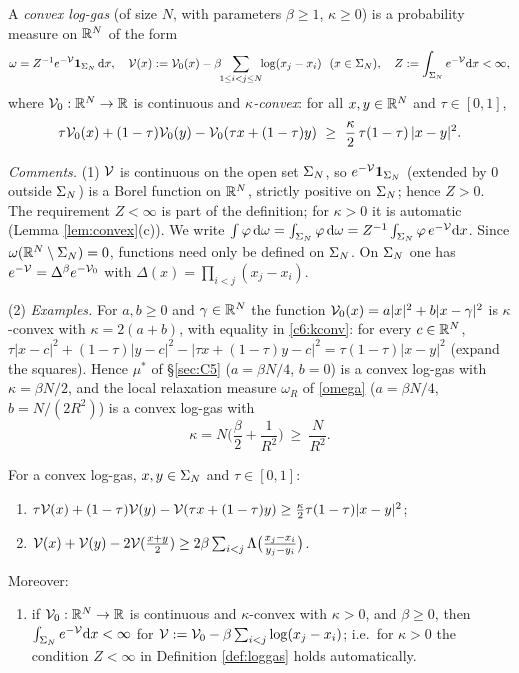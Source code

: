 \begin{definition}\label{def:loggas}
A \emph{convex log-gas} (of size $N$, with parameters $\beta\ge1$, $\kappa\ge0$) is a probability measure on $\mathbb{R}^N$ of the form
\[\omega=Z^{-1}e^{-\mathcal{V}}\mathbf 1_{\Sigma_N}\,\mathrm{d} x,\quad \mathcal{V}(x):=\mathcal{V}_0(x)-\beta\!\!\sum_{1\le i<j\le N}\!\!\log(x_j-x_i)\ \ (x\in\Sigma_N),\quad Z:=\int_{\Sigma_N}e^{-\mathcal{V}}\mathrm{d} x<\infty,\]
where $\mathcal{V}_0:\mathbb{R}^N\to\mathbb{R}$ is continuous and \emph{$\kappa$-convex}: for all $x,y\in\mathbb{R}^N$ and $\tau\in[0,1]$,
\begin{equation}\label{c6:kconv}
\tau\cV_0(x)+(1-\tau)\cV_0(y)-\cV_0(\tau x+(1-\tau)y)\ \ge\ \frac\kappa2\,\tau(1-\tau)\,|x-y|^2 .
\end{equation}
\end{definition}

\noindent\emph{Comments.}
(1) $\mathcal{V}$ is continuous on the open set $\Sigma_N$, so $e^{-\mathcal{V}}\mathbf 1_{\Sigma_N}$ (extended by $0$ outside $\Sigma_N$) is a Borel function on $\mathbb{R}^N$, strictly positive on $\Sigma_N$; hence $Z>0$. The requirement $Z<\infty$ is part of the definition; for $\kappa>0$ it is automatic (Lemma \ref{lem:convex}(c)).
We write $\int\varphi\,\mathrm{d}\omega=\int_{\Sigma_N}\varphi\,\mathrm{d}\omega=Z^{-1}\int_{\Sigma_N}\varphi\,e^{-\mathcal{V}}\mathrm{d} x$. Since $\omega(\mathbb{R}^N\setminus\Sigma_N)=0$, functions need only be defined on $\Sigma_N$.
On $\Sigma_N$ one has $e^{-\mathcal{V}}=\Delta^\beta e^{-\mathcal{V}_0}$ with $\Delta(x)=\prod_{i<j}(x_j-x_i)$.

(2) \emph{Examples.} For $a,b\ge0$ and $\gamma\in\mathbb{R}^N$ the function $\mathcal{V}_0(x)=a|x|^2+b|x-\gamma|^2$ is $\kappa$-convex with $\kappa=2(a+b)$, with equality in \eqref{c6:kconv}: for every $c\in\mathbb{R}^N$,
$\tau|x-c|^2+(1-\tau)|y-c|^2-|\tau x+(1-\tau)y-c|^2=\tau(1-\tau)|x-y|^2$ (expand the squares).
Hence $\mu^*$ of \S\ref{sec:C5} ($a=\beta N/4$, $b=0$) is a convex log-gas with $\kappa=\beta N/2$, and the local relaxation measure $\omega_R$ of \eqref{omega} ($a=\beta N/4$, $b=N/(2R^2)$) is a convex log-gas with
\[\kappa=N\Big(\frac\beta2+\frac1{R^2}\Big)\ \ge\ \frac N{R^2}.\]

\begin{lemma}\label{lem:convex}
For a convex log-gas, $x,y\in\Sigma_N$ and $\tau\in[0,1]$:
\begin{enumerate}[label=\textup{(\alph*)},leftmargin=2em,itemsep=1pt]
\item $\tau\mathcal{V}(x)+(1-\tau)\mathcal{V}(y)-\mathcal{V}(\tau x+(1-\tau)y)\ge\frac\kappa2\tau(1-\tau)|x-y|^2$;
\item $\mathcal{V}(x)+\mathcal{V}(y)-2\mathcal{V}(\frac{x+y}2)\ge2\beta\sum_{i<j}\Lambda\big(\frac{x_j-x_i}{y_j-y_i}\big)$.
\end{enumerate}
Moreover:
\begin{enumerate}[label=\textup{(\alph*)},leftmargin=2em,itemsep=1pt,start=3]
\item
if $\mathcal{V}_0:\mathbb{R}^N\to\mathbb{R}$ is continuous and $\kappa$-convex with $\kappa>0$, and $\beta\ge0$, then $\int_{\Sigma_N}e^{-\mathcal{V}}\mathrm{d} x<\infty$ for $\mathcal{V}:=\mathcal{V}_0-\beta\sum_{i<j}\log(x_j-x_i)$; i.e.\ for $\kappa>0$ the condition $Z<\infty$ in Definition \ref{def:loggas} holds automatically.
\end{enumerate}
\end{lemma}

